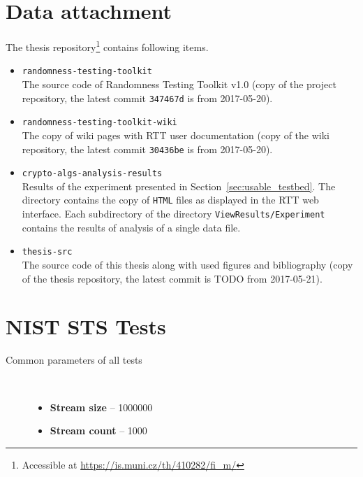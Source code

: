 \documentclass[
	digital,    %
	oneside,
	color,
	11pt,
	nocover,
	notable,
	nolof,
	nolot,
]{fithesis3}
\newenvironment{titlemize}[1]
{
	\begin{description}
	\item[#1]\
	\begin{itemize}
}
{
	\end{itemize}
 	\end{description}
}
\theoremstyle{definition}
\theoremstyle{remark}
\begin{document}
\chapter{Data attachment}
\label{app:data_att}
The thesis repository\footnote{Accessible at \url{https://is.muni.cz/th/410282/fi_m/}}  contains following items.
\begin{itemize}
\item \texttt{randomness-testing-toolkit} \\
The source code of Randomness Testing Toolkit v1.0 (copy of the project repository, the latest commit \texttt{347467d} is from 2017-05-20).
\item \texttt{randomness-testing-toolkit-wiki} \\
The copy of wiki pages with RTT user documentation (copy of the wiki repository, the latest commit \texttt{30436be} is from 2017-05-20).
\item \texttt{crypto-algs-analysis-results} \\
Results of the experiment presented in Section~\ref{sec:usable_testbed}. The directory contains the copy of \texttt{HTML} files as displayed in the RTT web interface. Each subdirectory of the directory \texttt{ViewResults/Experiment} contains the results of analysis of a single data file. 
\item \texttt{thesis-src} \\
The source code of this thesis along with used figures and bibliography (copy of the thesis repository, the latest commit is TODO from 2017-05-21).
\end{itemize}

\chapter{NIST STS Tests}
\label{app:nist_sts_tests}

\begin{titlemize}{Common parameters of all tests}
\item \textbf{Stream size} -- 1000000
\item \textbf{Stream count} -- 1000
\end{titlemize}
\end{document}
